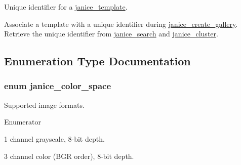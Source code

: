 Unique identifier for a \hyperlink{group__janice_ga5593b06e86b90504968c0fc191ee2f3c}{janice\+\_\+template}. 

Associate a template with a unique identifier during \hyperlink{group__janice_ga7a6e3e319b076e925e4d1ef7f51ae3a0}{janice\+\_\+create\+\_\+gallery}. Retrieve the unique identifier from \hyperlink{group__janice_gacf0576e4ddcad691ff955fc3eee1e2eb}{janice\+\_\+search} and \hyperlink{group__janice_ga9696667941fe25bd7ddf7623a1723cb2}{janice\+\_\+cluster}. 

\subsection{Enumeration Type Documentation}
\hypertarget{group__janice_ga4040c8aa81857fc2102f27cf34cd973e}{}
\subsubsection[{janice\+\_\+color\+\_\+space}]{\setlength{\rightskip}{0pt plus 5cm}enum {\bf janice\+\_\+color\+\_\+space}}\label{group__janice_ga4040c8aa81857fc2102f27cf34cd973e}


Supported image formats. 

\begin{Desc}
\item[Enumerator]\par
\begin{description}
\item[{\em 
\hypertarget{group__janice_gga4040c8aa81857fc2102f27cf34cd973eacd24e66ad3d44f6e65ba0e1d55719d7b}{}J\+A\+N\+I\+C\+E\+\_\+\+G\+R\+A\+Y8\label{group__janice_gga4040c8aa81857fc2102f27cf34cd973eacd24e66ad3d44f6e65ba0e1d55719d7b}
}]1 channel grayscale, 8-\/bit depth. \item[{\em 
\hypertarget{group__janice_gga4040c8aa81857fc2102f27cf34cd973ea45503c486c3f4d472d838e5d8ba9e4f4}{}J\+A\+N\+I\+C\+E\+\_\+\+B\+G\+R24\label{group__janice_gga4040c8aa81857fc2102f27cf34cd973ea45503c486c3f4d472d838e5d8ba9e4f4}
}]3 channel color (B\+G\+R order), 8-\/bit depth. \end{description}
\end{Desc}
\hypertarget{group__janice_ga4873d49c1f9d6a6880dfbd485cf6ba72}{}
